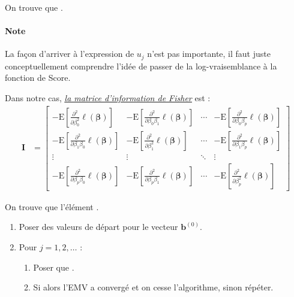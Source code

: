 \documentclass[french]{article}
\begin{document}
\begin{multicols*}{2}
On trouve que . 

\paragraph{Note}	La façon d'arriver à l'expression de $u_{j}$ n'est pas importante, il faut juste  conceptuellement comprendre l'idée de passer de la log-vraisemblance à la fonction de Score.

\bigskip

Dans notre cas, \textit{\color{bleudefrance}\underline{\hyperlink{FisherInfoDef}{\color{bleudefrance} la matrice d'information de Fisher}}} est : 
\begin{align*}
	\bm{I}
	&=	\begin{bmatrix}
		-\text{E}\left[\frac{\partial^{2}}{\partial\beta_{0}^{2}}\ell(\bm{\beta})\right]		&	-\text{E}\left[\frac{\partial^{2}}{\partial\beta_{0}\beta_{1}}\ell(\bm{\beta})\right]		&	\cdots	&	-\text{E}\left[\frac{\partial^{2}}{\partial\beta_{0}\beta_{p}}\ell(\bm{\beta})\right]		\\
		-\text{E}\left[\frac{\partial^{2}}{\partial\beta_{1}\beta_{0}}\ell(\bm{\beta})\right]		&	-\text{E}\left[\frac{\partial^{2}}{\partial\beta_{1}^{2}}\ell(\bm{\beta})\right]		&	\cdots	&	-\text{E}\left[\frac{\partial^{2}}{\partial\beta_{1}\beta_{p}}\ell(\bm{\beta})\right]		\\
		\vdots	&	\vdots	&	\ddots	&	\vdots	\\
		-\text{E}\left[\frac{\partial^{2}}{\partial\beta_{p}\beta_{0}}\ell(\bm{\beta})\right]		&	-\text{E}\left[\frac{\partial^{2}}{\partial\beta_{p}\beta_{1}}\ell(\bm{\beta})\right]		&	\cdots	&	-\text{E}\left[\frac{\partial^{2}}{\partial\beta_{p}^{2}}\ell(\bm{\beta})\right]
		\end{bmatrix}
\end{align*}

\bigskip

On trouve que l'élément .

\begin{algo2}
\begin{enumerate}
	\item	Poser des valeurs de départ pour le vecteur $\bm{b}^{(0)}$.
	\item	Pour $j = 1, 2, \dots$ :
		\begin{enumerate}
		\item	Poser que .
		\item	Si  alors l'EMV a convergé et on cesse l'algorithme, sinon répéter.
		\end{enumerate}
\end{enumerate}
\end{algo2}


\end{multicols*}
\end{document}
